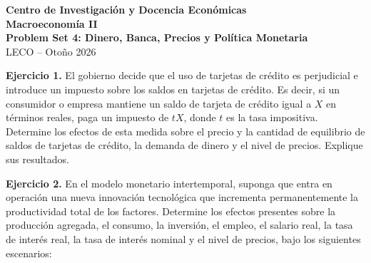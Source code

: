 \documentclass[11pt]{article}
\begin{document}
\begin{center}
  {\large\textbf{Centro de Investigación y Docencia Económicas}}\\[0.25em]
  {\large\textbf{Macroeconomía II}}\\[0.2em]
  {\large\textbf{Problem Set 4: Dinero, Banca, Precios y Política Monetaria}}\\[0.35em]
  LECO -- Otoño 2026
\end{center}

\vspace{0.6em}

\textbf{Ejercicio 1.} El gobierno decide que el uso de tarjetas de crédito es perjudicial e introduce un impuesto sobre los saldos en tarjetas de crédito. Es decir, si un consumidor o empresa mantiene un saldo de tarjeta de crédito igual a \(X\) en términos reales, paga un impuesto de \(tX\), donde \(t\) es la tasa impositiva. Determine los efectos de esta medida sobre el precio y la cantidad de equilibrio de saldos de tarjetas de crédito, la demanda de dinero y el nivel de precios. Explique sus resultados.

\vspace{0.5em}

\textbf{Ejercicio 2.} En el modelo monetario intertemporal, suponga que entra en operación una nueva innovación tecnológica que incrementa permanentemente la productividad total de los factores. Determine los efectos presentes sobre la producción agregada, el consumo, la inversión, el empleo, el salario real, la tasa de interés real, la tasa de interés nominal y el nivel de precios, bajo los siguientes escenarios:
\end{document}
